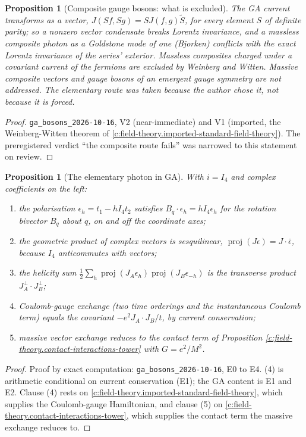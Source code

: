 \documentclass[11pt]{article}
\newtheorem{proposition}[theorem]{Proposition}
\theoremstyle{definition}
\theoremstyle{plain}
\providecommand{\proj}{}\renewcommand{\proj}{\operatorname{proj}}
\begin{document}
\begin{proposition}[Composite gauge bosons: what is excluded]\label{c:field-theory.composite-gauge-bosons-what-excluded}
The GA current transforms as a vector, $J(Sf, Sg) = SJ(f,g)\tilde S$, for every element $S$ of definite parity; so a nonzero vector condensate breaks Lorentz invariance, and a massless composite photon as a Goldstone mode of one (Bjorken) conflicts with the exact Lorentz invariance of the series' exterior. Massless composites charged under a covariant current of the fermions are excluded by Weinberg and Witten. Massive composite vectors and gauge bosons of an emergent gauge symmetry are not addressed. The elementary route was taken because the author chose it, not because it is forced.
\end{proposition}
\begin{proof}
\texttt{ga\_bosons\_2026-10-16}, V2 (near-immediate) and V1 (imported, the Weinberg-Witten theorem of \ref{c:field-theory.imported-standard-field-theory}). The preregistered verdict ``the composite route fails'' was narrowed to this statement on review.

\end{proof}

\begin{proposition}[The elementary photon in GA]\label{c:field-theory.elementary-photon-ga}
With $i = I_4$ and complex coefficients on the left:
\begin{enumerate}
\item the polarisation $\epsilon_h = t_1 - hI_4t_2$ satisfies $B_q\cdot\epsilon_h = hI_4\epsilon_h$ for the rotation bivector $B_q$ about $q$, on and off the coordinate axes;
\item the geometric product of complex vectors is sesquilinear, $\proj(J\epsilon) = J\cdot\bar\epsilon$, because $I_4$ anticommutes with vectors;
\item the helicity sum $\tfrac12\sum_h\proj(J_A\epsilon_h)\proj(J_B\epsilon_{-h})$ is the transverse product $J_A^\perp\cdot J_B^\perp$;
\item Coulomb-gauge exchange (two time orderings and the instantaneous Coulomb term) equals the covariant $-e^2J_A\cdot J_B/t$, by current conservation;
\item massive vector exchange reduces to the contact term of Proposition \ref{c:field-theory.contact-interactions-tower} with $G = e^2/M^2$.
\end{enumerate}
\end{proposition}
\begin{proof}
Proof by exact computation: \texttt{ga\_bosons\_2026-10-16}, E0 to E4. (4) is arithmetic conditional on current conservation (E1); the GA content is E1 and E2. Clause (4) rests on \ref{c:field-theory.imported-standard-field-theory}, which supplies the Coulomb-gauge Hamiltonian, and clause (5) on \ref{c:field-theory.contact-interactions-tower}, which supplies the contact term the massive exchange reduces to.

\end{proof}
\end{document}

